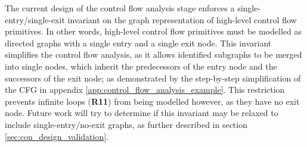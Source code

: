 
The current design of the control flow analysis stage enforces a single-entry/single-exit invariant on the graph representation of high-level control flow primitives. In other words, high-level control flow primitives must be modelled as directed graphs with a single entry and a single exit node. This invariant simplifies the control flow analysis, as it allows identified subgraphs to be merged into single nodes, which inherit the predecessors of the entry node and the successors of the exit node; as demonstrated by the step-by-step simplification of the CFG in appendix \ref{app:control_flow_analysis_example}. This restriction prevents infinite loops (\textbf{R11}) from being modelled however, as they have no exit node. Future work will try to determine if this invariant may be relaxed to include single-entry/no-exit graphs, as further described in section \ref{sec:con_design_validation}.
